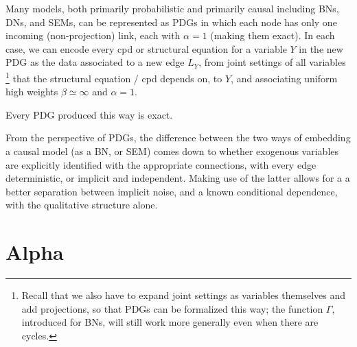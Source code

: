 \documentclass{article}
\newcommand{\N}{\mathcal N}
\newcommand{\Ed}{\mathcal A}
\newcommand{\dg}[1]{\mathsf #1}
\theoremstyle{plain}
\newtheorem{claim}[theorem]{Claim}
\theoremstyle{definition}
\newtheorem{defn}{Definition}
\theoremstyle{remark}
\begin{document}
Many models, both primarily probabilistic and primarily causal including BNs, DNs, and SEMs, can be represented as PDGs in which each node has only one incoming (non-projection) link, each with $\alpha=1$ (making them exact).%
In each case, we can encode every cpd or structural equation for a variable $Y$ in the new PDG as the data associated to a new edge $L_Y$, from joint settings of all variables%
		\footnote{Recall that we also have to expand joint settings as variables themselves and add projections, so that PDGs can be formalized this way; the function $\Gamma$, introduced for BNs, will still work more generally even when there are cycles.}
that the structural equation / cpd depends on, to $Y$, and associating uniform high weights $\beta \simeq \infty$ and $\alpha = 1$.%

Every PDG produced this way is exact.

From the perspective of PDGs, the difference between the two ways of embedding a causal model (as a BN, or SEM) comes down to whether exogenous variables are explicitly identified with the appropriate connections, with every edge deterministic, or implicit and independent. Making use of the latter allows for a a better separation between implicit noise, and a known conditional dependence, with the qualitative structure alone.



%



\clearpage
\section{Alpha}
\end{document}
